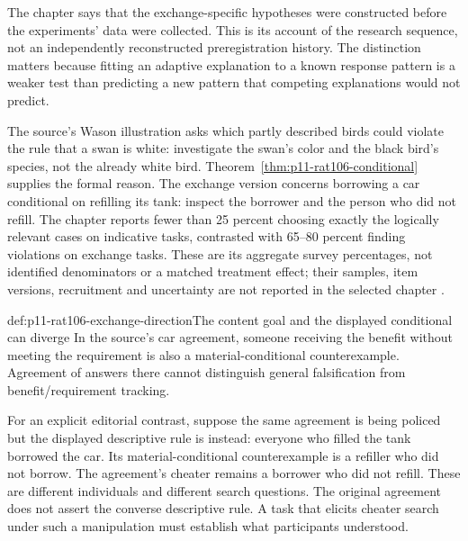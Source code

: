 The chapter says that the exchange-specific hypotheses were constructed
before the experiments' data were collected. This is its account of
the research sequence, not an independently reconstructed preregistration
history. The distinction matters because fitting an adaptive explanation
to a known response pattern is a weaker test than predicting a new
pattern that competing explanations would not predict.

The source's Wason illustration asks which partly described birds
could violate the rule that a swan is white: investigate the swan's
color and the black bird's species, not the already white bird.
Theorem~\ref{thm:p11-rat106-conditional} supplies the formal reason.
The exchange version concerns borrowing a car conditional on refilling
its tank: inspect the borrower and the person who did not refill.
The chapter reports fewer than 25 percent choosing exactly the
logically relevant cases on indicative tasks, contrasted with 65--80
percent finding violations on exchange tasks. These are its aggregate
survey percentages, not identified denominators or a matched treatment
effect; their samples, item versions, recruitment and uncertainty are
not reported in the selected chapter
\cite[pp.~639--640]{CosmidesTooby2021Adaptationism}.

\begin{hbexample}{def:p11-rat106-exchange-direction}{The content goal and the displayed conditional can diverge}
In the source's car agreement, someone receiving the benefit without
meeting the requirement is also a material-conditional counterexample.
Agreement of answers there cannot distinguish general falsification
from benefit/requirement tracking.

For an explicit editorial contrast, suppose the same agreement is
being policed but the displayed descriptive rule is instead: everyone
who filled the tank borrowed the car. Its material-conditional
counterexample is a refiller who did not borrow. The agreement's cheater
remains a borrower who did not refill. These are different individuals
and different search questions. The original agreement does not assert
the converse descriptive rule. A task that elicits cheater search under
such a manipulation must establish what participants understood.
\end{hbexample}

